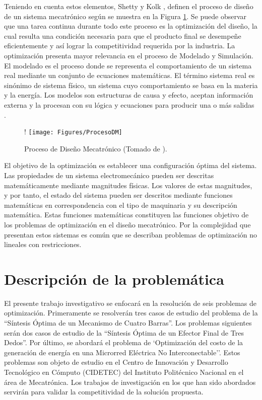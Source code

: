  Teniendo en cuenta estos elementos, Shetty y Kolk \cite{shetty_mechatronics_2010}, definen el proceso de diseño de un sistema mecatrónico según se muestra en la Figura \ref{DMecatronico}. Se puede observar que una tarea continua durante todo este proceso es la optimización del diseño, la cual resulta una condición necesaria para que el producto final se desempeñe eficientemente y así lograr la competitividad requerida por la industria. La optimización presenta mayor relevancia en el proceso de Modelado y Simulación. El modelado es el proceso  donde se representa el comportamiento de un sistema real mediante un conjunto de  ecuaciones matemáticas. El término sistema real es sinónimo de sistema físico, un sistema cuyo comportamiento se basa en la materia y la energía. Los modelos son estructuras de causa y efecto, aceptan información externa y la procesan con su lógica y ecuaciones para producir una o más salidas \cite{fritzson_basic_2011}.
	
	\begin{figure}[htb]
		\begin{center}
		 \resizebox {\textwidth} {!} {	
			\texttt{[image: Figures/ProcesoDM]}
		}
			\caption[Proceso de Diseño Mecatrónico]{Proceso de Diseño Mecatrónico (Tomado de \cite{shetty_mechatronics_2010}).}
			\label{DMecatronico}
		\end{center}
	\end{figure}


 El objetivo de la optimización es establecer una configuración óptima del sistema. Las propiedades de un sistema electromecánico pueden ser descritas matemáticamente mediante magnitudes físicas. Los valores de estas magnitudes, y por tanto, el estado del sistema pueden ser descritos mediante funciones matemáticas en correspondencia con el tipo de maquinaria y su descripción matemática.  Estas funciones matemáticas constituyen las funciones objetivo de los problemas de optimización en el diseño mecatrónico. Por la complejidad que presentan estos sistemas es común que se describan problemas de optimización no lineales con  restricciones.

 \section{Descripción de la problemática}
  El presente trabajo investigativo se enfocará en la resolución de seis problemas de optimización. Primeramente se resolverán tres casos de estudio del problema de la ``Síntesis Óptima de un Mecanismo de Cuatro Barras''. Los problemas siguientes serán dos casos de estudio de la ``Síntesis Óptima de un Efector Final de Tres Dedos''. Por último, se abordará el problema de `Optimización del costo de la generación de energía en una Microrred Eléctrica No Interconectable''. Estos problemas son objeto de estudio en el Centro de Innovación y Desarrollo Tecnológico  en Cómputo (CIDETEC) del Instituto Politécnico Nacional en el área de Mecatrónica. Los trabajos de investigación en los que han sido abordados servirán para validar la competitividad de la solución propuesta. 

